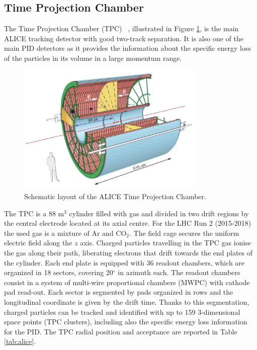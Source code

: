%
\subsection{Time Projection Chamber} \label{sec:tpc}

The Time Projection Chamber (TPC) ~\cite{alice_tpc}, illustrated in Figure \ref{fig:tpc}, 
is the main ALICE tracking detector with good two-track separation. 
It is also one of the main PID detectors as it provides the information about the specific energy 
loss of the particles in its volume in a large momentum range. 

\begin{figure}
    \captionsetup{justification=centering}
    \centering
    \includegraphics[width=0.8\textwidth]{gfx/tpc}
	\caption{Schematic layout of the ALICE Time Projection Chamber.}
	\label{fig:tpc}
\end{figure}

The TPC is a 88 m$^3$ cylinder filled with gas and divided in two drift regions by the
central electrode located at its axial centre. 
For the LHC Run 2 (2015-2018) the used gas is a mixture of Ar and CO$_2$.
The field cage secures the uniform electric field along the $z$ axis.
Charged particles travelling in the TPC gas ionise the gas along their path, liberating electrons 
that drift towards the end plates of the cylinder. 
Each end plate is equipped with 36 readout chambers, which are organized in 18 sectors, covering 
20$^{\circ}$ in azimuth each. 
The readout chambers consist in a system of multi-wire proportional chambers (MWPC) with cathode pad
read-out. Each sector is segmented by pads organized in rows and the longitudinal coordinate is given
by the drift time. 
Thanks to this segmentation, charged particles can be tracked and identified with up to 159 
3-dimensional space points (TPC clusters), including also the specific energy loss information
for the PID. The TPC radial position and acceptance are reported in Table \ref{tab:alice}.

